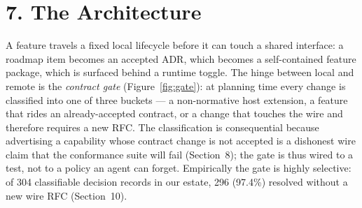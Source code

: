 \documentclass[11pt]{article}
\begin{document}
\section*{7. The Architecture}
A feature travels a fixed local lifecycle before it can touch a shared interface: a roadmap item
becomes an accepted ADR, which becomes a self-contained feature package, which is surfaced behind a
runtime toggle. The hinge between local and remote is the \emph{contract gate} (Figure~\ref{fig:gate}):
at planning time every change is classified into one of three buckets --- a non-normative host
extension, a feature that rides an already-accepted contract, or a change that touches the wire and
therefore requires a new RFC. The classification is consequential because advertising a capability
whose contract change is not accepted is a dishonest wire claim that the conformance suite will fail
(Section~8); the gate is thus wired to a test, not to a policy an agent can forget. Empirically the
gate is highly selective: of 304 classifiable decision records in our estate, 296 (97.4\%) resolved
without a new wire RFC (Section~10).
\end{document}
